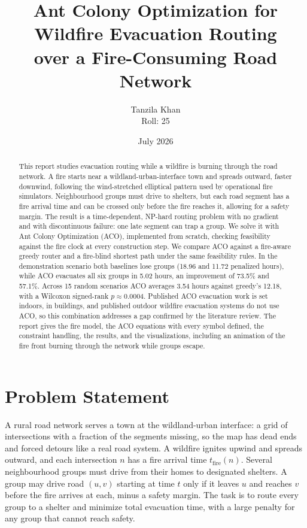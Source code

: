 \documentclass[11pt,a4paper]{article}
\title{\textbf{Ant Colony Optimization for Wildfire Evacuation Routing\\ over a Fire-Consuming Road Network}}
\author{Tanzila Khan \\ Roll: 25 }
\date{July 2026}
\begin{document}
\maketitle

\begin{abstract}
\noindent This report studies evacuation routing while a wildfire is burning through the road network. A fire starts near a wildland-urban-interface town and spreads outward, faster downwind, following the wind-stretched elliptical pattern used by operational fire simulators. Neighbourhood groups must drive to shelters, but each road segment has a fire arrival time and can be crossed only before the fire reaches it, allowing for a safety margin. The result is a time-dependent, NP-hard routing problem with no gradient and with discontinuous failure: one late segment can trap a group. We solve it with Ant Colony Optimization (ACO), implemented from scratch, checking feasibility against the fire clock at every construction step. We compare ACO against a fire-aware greedy router and a fire-blind shortest path under the same feasibility rules. In the demonstration scenario both baselines lose groups (18.96 and 11.72 penalized hours), while ACO evacuates all six groups in 5.02 hours, an improvement of 73.5\% and 57.1\%. Across 15 random scenarios ACO averages 3.54 hours against greedy's 12.18, with a Wilcoxon signed-rank $p \approx 0.0004$. Published ACO evacuation work is set indoors, in buildings, and published outdoor wildfire evacuation systems do not use ACO, so this combination addresses a gap confirmed by the literature review. The report gives the fire model, the ACO equations with every symbol defined, the constraint handling, the results, and the visualizations, including an animation of the fire front burning through the network while groups escape.
\end{abstract}

\bigskip

\section{Problem Statement}

A rural road network serves a town at the wildland-urban interface: a grid of intersections with a fraction of the segments missing, so the map has dead ends and forced detours like a real road system. A wildfire ignites upwind and spreads outward, and each intersection $n$ has a fire arrival time $t_{\text{fire}}(n)$. Several neighbourhood groups must drive from their homes to designated shelters. A group may drive road $(u, v)$ starting at time $t$ only if it leaves $u$ and reaches $v$ before the fire arrives at each, minus a safety margin. The task is to route every group to a shelter and minimize total evacuation time, with a large penalty for any group that cannot reach safety.
\end{document}
